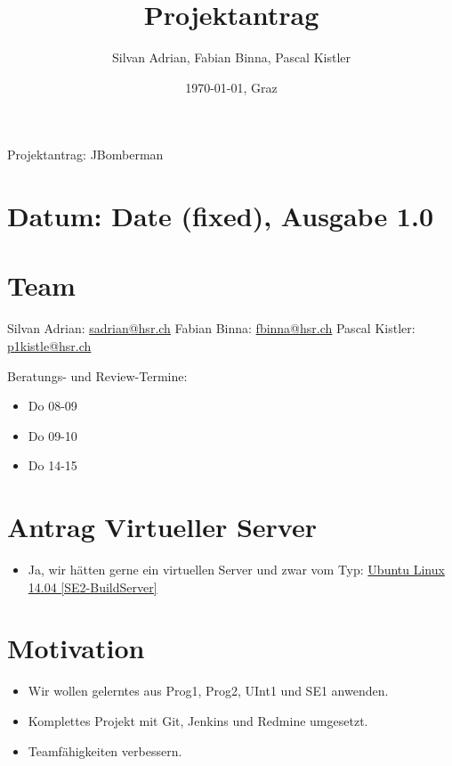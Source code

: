 \documentclass[11pt]{scrartcl}
\title{Projektantrag}
\author{Silvan Adrian, Fabian Binna, Pascal Kistler}
\date{\today{}, Graz}
\begin{document}
\begin{center}
{\huge Projektantrag: JBomberman}
\end{center}

\section{Datum: Date (fixed), Ausgabe 1.0}
\label{sec:datum}

\section{Team}
\label{sec:Team}
Silvan Adrian: \href{mailto:sadrian@hsr.ch}{sadrian@hsr.ch}\newline
Fabian Binna: \href{mailto:fbinna@hsr.ch}{fbinna@hsr.ch}\newline
Pascal Kistler: \href{mailto:p1kistle@hsr.ch}{p1kistle@hsr.ch}\newline

Beratungs- und Review-Termine:
\begin{itemize}
    \item Do 08-09
    \item Do 09-10
    \item Do 14-15
\end{itemize}

\section{Antrag Virtueller Server}
\label{sec:antragserver}
\begin{itemize}
    \item Ja, wir hätten gerne ein virtuellen Server und zwar vom Typ:
    \uline {Ubuntu Linux 14.04 [SE2-BuildServer]}
\end{itemize}

\section{Motivation}
\label{sec:motivation}
\begin{itemize}
    \item Wir wollen gelerntes aus Prog1, Prog2, UInt1 und SE1 anwenden.
    \item Komplettes Projekt mit Git, Jenkins und Redmine umgesetzt.
    \item Teamfähigkeiten verbessern.
\end{itemize}
\end{document}
